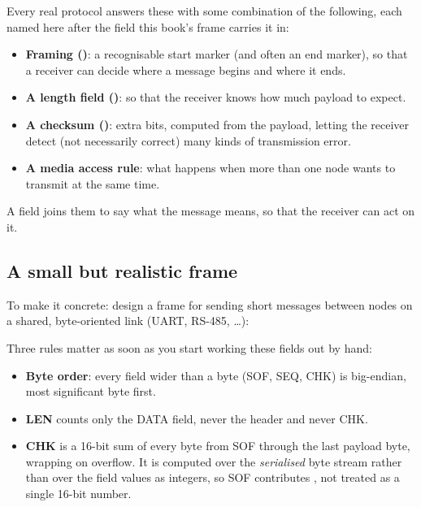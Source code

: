 Every real protocol answers these with some combination of the following, each named here after the
field this book's frame carries it in:
\begin{itemize}
  \item \textbf{Framing ()}: a recognisable start marker (and often an end marker), so
    that a receiver can decide where a message begins and where it ends.
  \item \textbf{A length field ()}: so that the receiver knows how much payload to expect.
  \item \textbf{A checksum ()}: extra bits, computed from the payload, letting the
    receiver detect (not necessarily correct) many kinds of transmission error.
  \item \textbf{A media access rule}: what happens when more than one node wants to transmit at the
    same time.
\end{itemize}

A  field joins them to say what the message means, so that the receiver can act on it.

\subsection*{A small but realistic frame}
To make it concrete: design a frame for sending short messages between nodes on a shared,
byte-oriented link (UART, RS-485, \dots):


Three rules matter as soon as you start working these fields out by hand:
\begin{itemize}
  \item \textbf{Byte order}: every field wider than a byte (SOF, SEQ, CHK) is big-endian, most
    significant byte first.
  \item \textbf{LEN} counts only the DATA field, never the header and never CHK.
  \item \textbf{CHK} is a 16-bit sum of every byte from SOF through the last payload byte, wrapping
    on overflow. It is computed over the \emph{serialised} byte stream rather than over the field
    values as integers, so SOF contributes , not  treated as a single
    16-bit number.
\end{itemize}

